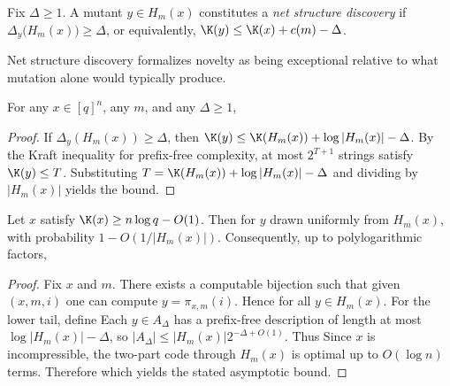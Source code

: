 \begin{definition}\label{def:si:discovery}
Fix $\Delta\ge 1$. A mutant $y\in H_m(x)$ constitutes a \emph{net structure discovery} if
$\Delta_y\big(H_m(x)\big)\ge\Delta$, or equivalently, $\K(y)\le \K(x)+c(m)-\Delta$.
\end{definition}
Net structure discovery formalizes novelty as being exceptional relative to what mutation alone would typically produce.

\begin{theorem}\label{thm:si:upper}
For any $x\in[q]^n$, any $m$, and any $\Delta\ge 1$,
\end{theorem}

\begin{proof}
If $\Delta_y(H_m(x))\ge\Delta$, then
$\K(y)\le \K(H_m(x))+\log|H_m(x)|-\Delta$.
By the Kraft inequality for prefix-free complexity, at most $2^{T+1}$ strings satisfy $\K(y)\le T$. Substituting
$T=\K(H_m(x))+\log|H_m(x)|-\Delta$ and dividing by $|H_m(x)|$ yields the bound.
\end{proof}

\begin{lemma}\label{lem:si:tight}
Let $x$ satisfy $\K(x)\ge n\log q-O(1)$. Then for $y$ drawn uniformly from $H_m(x)$,
with probability $1-O(1/|H_m(x)|)$. Consequently, up to polylogarithmic factors,
\end{lemma}

\begin{proof}
Fix $x$ and $m$. There exists a computable bijection
such that given $(x,m,i)$ one can compute $y=\pi_{x,m}(i)$. Hence
for all $y\in H_m(x)$. For the lower tail, define
Each $y\in A_\Delta$ has a prefix-free description of length at most
$\log|H_m(x)|-\Delta$, so $|A_\Delta|\le |H_m(x)|2^{-\Delta+O(1)}$. Thus
Since $x$ is incompressible, the two-part code through $H_m(x)$ is optimal up to $O(\log n)$ terms. Therefore
which yields the stated asymptotic bound.
\end{proof}

